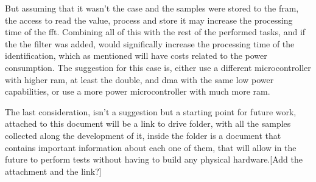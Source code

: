But assuming that it wasn't the case and the samples were stored to the \acrshort{fram}, the access to read the value, process and store it may increase the processing time of the \acrshort{fft}. Combining all of this with the rest of the performed tasks, and if the the filter was added, would significally increase the processing time of the identification, which as mentioned will have costs related to the power consumption. The suggestion for this case is, either use a different microcontroller with higher \acrshort{ram}, at least the double, and \acrshort{dma} with the same low power capabilities, or use a more power microcontroller with much more \acrshort{ram}.

The last consideration, isn't a suggestion but a starting point for future work, attached to this document will be a link to drive folder, with all the samples collected along the development of it, inside the folder is a document that contains important information about each one of them, that will allow in the future to perform tests without having to build any physical hardware.[Add the attachment and the link?]


